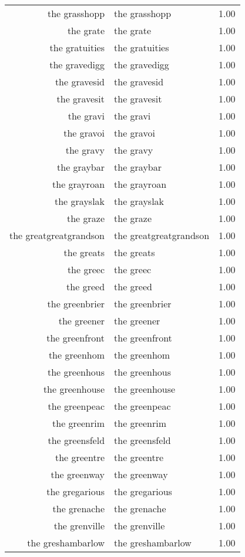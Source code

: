 \begin{table}[ht]
\begin{tabular}{rlr}
  the grasshopp & the grasshopp & 1.00 \\ 
  the grate & the grate & 1.00 \\ 
  the gratuities & the gratuities & 1.00 \\ 
  the gravedigg & the gravedigg & 1.00 \\ 
  the gravesid & the gravesid & 1.00 \\ 
  the gravesit & the gravesit & 1.00 \\ 
  the gravi & the gravi & 1.00 \\ 
  the gravoi & the gravoi & 1.00 \\ 
  the gravy & the gravy & 1.00 \\ 
  the graybar & the graybar & 1.00 \\ 
  the grayroan & the grayroan & 1.00 \\ 
  the grayslak & the grayslak & 1.00 \\ 
  the graze & the graze & 1.00 \\ 
  the greatgreatgrandson & the greatgreatgrandson & 1.00 \\ 
  the greats & the greats & 1.00 \\ 
  the greec & the greec & 1.00 \\ 
  the greed & the greed & 1.00 \\ 
  the greenbrier & the greenbrier & 1.00 \\ 
  the greener & the greener & 1.00 \\ 
  the greenfront & the greenfront & 1.00 \\ 
  the greenhom & the greenhom & 1.00 \\ 
  the greenhous & the greenhous & 1.00 \\ 
  the greenhouse & the greenhouse & 1.00 \\ 
  the greenpeac & the greenpeac & 1.00 \\ 
  the greenrim & the greenrim & 1.00 \\ 
  the greensfeld & the greensfeld & 1.00 \\ 
  the greentre & the greentre & 1.00 \\ 
  the greenway & the greenway & 1.00 \\ 
  the gregarious & the gregarious & 1.00 \\ 
  the grenache & the grenache & 1.00 \\ 
  the grenville & the grenville & 1.00 \\ 
  the greshambarlow & the greshambarlow & 1.00 \\ 

\end{tabular}
\end{table}
